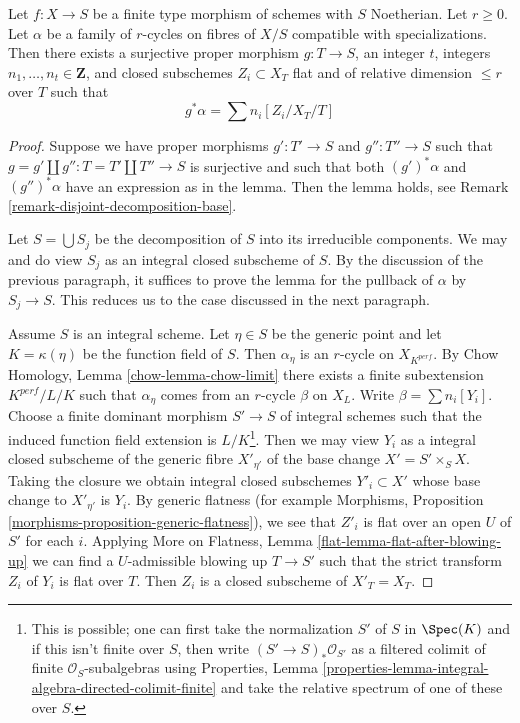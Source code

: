 \begin{lemma}
\label{lemma-get-cycles}
Let $f : X \to S$ be a finite type morphism of schemes with $S$ Noetherian.
Let $r \geq 0$. Let $\alpha$ be a family of $r$-cycles on fibres of $X/S$
compatible with specializations. Then there exists a surjective proper
morphism $g : T \to S$, an integer $t$, integers
$n_1, \ldots, n_t \in \mathbf{Z}$, and closed subschemes
$Z_i \subset X_T$ flat and of relative dimension $\leq r$ over $T$ such that
$$
g^*\alpha = \sum n_i [Z_i/X_T/T]
$$
\end{lemma}

\begin{proof}
Suppose we have proper morphisms $g' : T' \to S$ and $g'' : T'' \to S$
such that $g  = g' \amalg g'' : T = T' \amalg T'' \to S$
is surjective and such that both $(g')^*\alpha$ and $(g'')^*\alpha$
have an expression as in the lemma. Then the lemma holds, see
Remark \ref{remark-disjoint-decomposition-base}.

\medskip\noindent
Let $S = \bigcup S_j$ be the decomposition of $S$ into its irreducible
components. We may and do view $S_j$ as an integral closed subscheme of $S$.
By the discussion of the previous paragraph, it suffices to prove
the lemma for the pullback of $\alpha$ by $S_j \to S$. This reduces us
to the case discussed in the next paragraph.

\medskip\noindent
Assume $S$ is an integral scheme. Let $\eta \in S$ be the generic point
and let $K = \kappa(\eta)$ be the function field of $S$.
Then $\alpha_\eta$ is an $r$-cycle on $X_{K^{perf}}$.
By Chow Homology, Lemma \ref{chow-lemma-chow-limit}
there exists a finite subextension
$K^{perf}/L/K$ such that $\alpha_\eta$ comes from an $r$-cycle
$\beta$ on $X_L$. Write $\beta = \sum n_i[Y_i]$.
Choose a finite dominant morphism $S' \to S$ of integral schemes
such that the induced function field extension is $L/K$\footnote{This is
possible; one can first take the normalization $S'$ of $S$ in $\Spec(K)$
and if this isn't finite over $S$, then write $(S' \to S)_*\mathcal{O}_{S'}$
as a filtered colimit of finite $\mathcal{O}_S$-subalgebras using
Properties, Lemma
\ref{properties-lemma-integral-algebra-directed-colimit-finite}
and take the relative spectrum of one of these over $S$.}.
Then we may view $Y_i$ as a integral closed subscheme of the
generic fibre $X'_{\eta'}$ of the base change $X' = S' \times_S X$.
Taking the closure we obtain integral closed subschemes
$Y'_i \subset X'$ whose base change to $X'_{\eta'}$ is $Y_i$.
By generic flatness (for example Morphisms,
Proposition \ref{morphisms-proposition-generic-flatness}),
we see that $Z'_i$ is flat over an open $U$ of $S'$ for each $i$.
Applying More on Flatness, Lemma \ref{flat-lemma-flat-after-blowing-up}
we can find a $U$-admissible blowing up $T \to S'$
such that the strict transform $Z_i$ of $Y_i$ is flat over $T$.
Then $Z_i$ is a closed subscheme of $X'_T = X_T$.


\end{proof}

